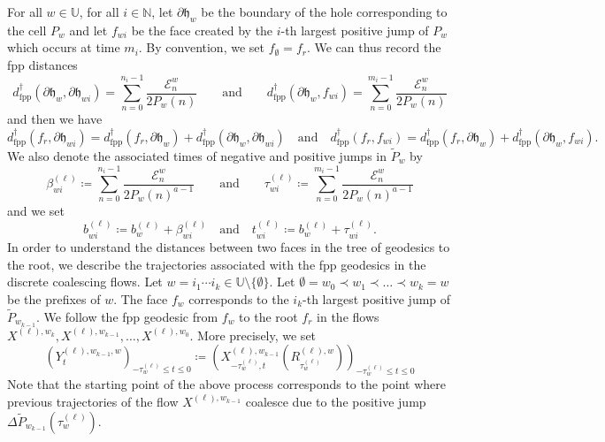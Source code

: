 \documentclass[11pt]{article}
\numberwithin{equation}{section}
\def \N{\mathbb{N}}
\def \U{\mathbb{U}}
\begin{document}
 For all $w \in \U$, for all $i \in \N$, let $\partial \mathfrak{h}_w$ be the boundary of the hole corresponding to the cell $P_w$ and let $f_{wi}$ be the face created by the $i$-th largest positive jump of $P_w$ which occurs at time $m_i$. By convention, we set $f_\emptyset= f_r$. We can thus record the fpp distances
 \begin{equation}\label{eq distance fpp cellule}
 d^\dagger_{\mathrm{fpp}} (\partial \mathfrak{h}_w, \partial \mathfrak{h}_{wi})
 = \sum_{n=0}^{n_i -1} \frac{\mathcal{E}^w_n}{2P_w(n)}
 \qquad\text{and}
 \qquad
 d^\dagger_{\mathrm{fpp}} (\partial \mathfrak{h}_w,  f_{wi})
 = \sum_{n=0}^{m_i -1} \frac{\mathcal{E}^w_n}{2P_w(n)}
 \end{equation}
 and then we have
 \begin{equation}\label{eq distance fpp racine recurrence}
 d^\dagger_{\mathrm{fpp}} (f_r, \partial \mathfrak{h}_{wi})
 =d^\dagger_{\mathrm{fpp}} (f_r, \partial \mathfrak{h}_{w}) + d^\dagger_{\mathrm{fpp}} (\partial \mathfrak{h}_w, \partial \mathfrak{h}_{wi})
 \quad \text{and}
 \quad
 d^\dagger_{\mathrm{fpp}} (f_r, f_{wi})
 =d^\dagger_{\mathrm{fpp}} (f_r, \partial \mathfrak{h}_{w})
 +d^\dagger_{\mathrm{fpp}} (\partial \mathfrak{h}_w, f_{wi}).
 \end{equation}
 We also denote the associated times of negative and positive jumps in $\widetilde{P}_w$ by
 $$
 \beta^{(\ell)}_{wi}
 \coloneqq \sum_{n=0}^{n_i -1} \frac{\mathcal{E}^w_n}{2P_w(n)^{a-1}}
 \qquad\text{and}
 \qquad
 \tau^{(\ell)}_{wi}
 \coloneqq \sum_{n=0}^{m_i -1} \frac{\mathcal{E}^w_n}{2P_w(n)^{a-1}}
 $$
 and we set
 $$
 b^{(\ell)}_{wi}
 \coloneqq b^{(\ell)}_w + \beta^{(\ell)}_{wi}
 \quad \text{and}
 \quad
 t^{(\ell)}_{wi}
 \coloneqq b^{(\ell)}_{w}
 + \tau^{(\ell)}_{wi}.
 $$
 In order to understand the distances between two faces in the tree of geodesics to the root, we describe the trajectories associated with the fpp geodesics in the discrete coalescing flows. Let $w = i_1 \cdots i_k \in \U \setminus \{\emptyset\}$. Let $\emptyset = w_0 \prec w_1 \prec \ldots \prec w_k = w$ be the prefixes of $w$. The face $f_w$ corresponds to the $i_k$-th largest positive jump of $\widetilde{P}_{w_{k-1}}$. We follow the fpp geodesic from $f_w$ to the root $f_r$ in the flows $X^{(\ell),w_k},X^{(\ell),w_{k-1}}, \ldots , X^{(\ell),w_0}$. More precisely, we set
 $$
 (Y^{(\ell), w_{k-1}, w}_t)_{-\tau^{(\ell)}_w \le t \le 0} \coloneqq 
 \left(
 X^{(\ell),w_{k-1}}_{-\tau^{(\ell)}_w, t}\left(R^{(\ell),w}_{\tau^{(\ell)}_w}\right)
 \right)_{-\tau^{(\ell)}_w \le t \le 0} 
 $$
 Note that the starting point of the above process corresponds to the point where previous trajectories of the flow $X^{(\ell),w_{k-1}}$ coalesce due to the positive jump $\Delta \widetilde{P}_{w_{k-1}}(\tau^{(\ell)}_w)$.
\end{document}
